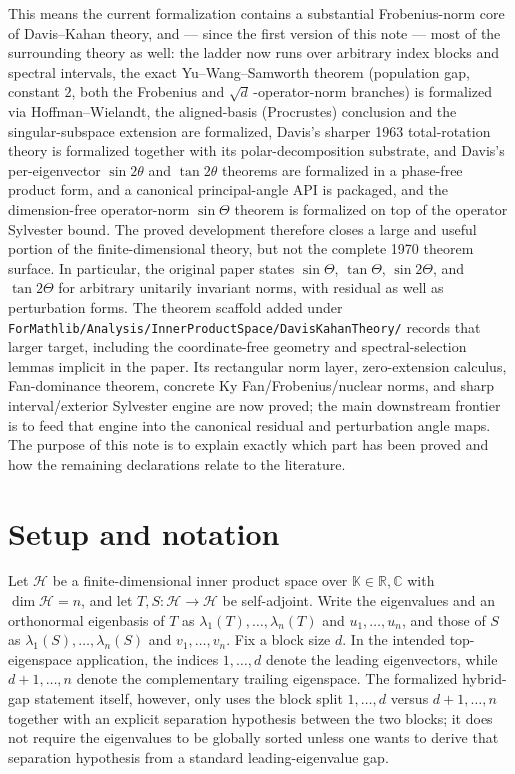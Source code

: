 \documentclass[11pt]{article}
\theoremstyle{remark}
\begin{document}
This means the current formalization contains a substantial Frobenius-norm core
of Davis--Kahan theory, and --- since the first version of this note --- most of
the surrounding theory as well: the ladder now runs over arbitrary index blocks
and spectral intervals, the exact Yu--Wang--Samworth theorem (population gap,
constant $2$, both the Frobenius and $\sqrt d\,$-operator-norm branches) is
formalized via Hoffman--Wielandt, the aligned-basis (Procrustes) conclusion and
the singular-subspace extension are formalized, Davis's sharper 1963
total-rotation theory is formalized together with its polar-decomposition
substrate, and Davis's per-eigenvector $\sin2\theta$ and $\tan2\theta$ theorems
are formalized in a phase-free product form, and a canonical principal-angle
API is packaged, and the dimension-free operator-norm $\sin\Theta$ theorem is
formalized on top of the operator Sylvester bound.  The proved development
therefore closes a large and useful portion of the finite-dimensional theory,
but not the complete 1970 theorem surface.  In particular, the original paper
states $\sin\Theta$, $\tan\Theta$, $\sin2\Theta$, and $\tan2\Theta$ for
arbitrary unitarily invariant norms, with residual as well as perturbation
forms.  The theorem scaffold added under
\texttt{ForMathlib/Analysis/InnerProductSpace/DavisKahanTheory/} records that
larger target, including the coordinate-free geometry and spectral-selection
lemmas implicit in the paper.  Its rectangular norm layer, zero-extension
calculus, Fan-dominance theorem, concrete Ky Fan/Frobenius/nuclear norms, and
sharp interval/exterior Sylvester engine are now proved; the main downstream
frontier is to feed that engine into the canonical residual and perturbation
angle maps.  The purpose of this note is to explain exactly which part has been
proved and how the remaining declarations relate to the literature.




\section{Setup and notation}

Let $\mathcal H$ be a finite-dimensional inner product space over
$\mathbb K\in{\mathbb R,\mathbb C}$ with $\dim\mathcal H=n$, and let
$T,S:\mathcal H\to\mathcal H$ be self-adjoint.  Write the eigenvalues and an
orthonormal eigenbasis of $T$ as $\lambda_1(T),\dots,\lambda_n(T)$ and
$u_1,\dots,u_n$, and those of $S$ as $\lambda_1(S),\dots,\lambda_n(S)$ and
$v_1,\dots,v_n$.  Fix a block size $d$.  In the intended top-eigenspace
application, the indices $1,\dots,d$ denote the leading eigenvectors, while
$d+1,\dots,n$ denote the complementary trailing eigenspace.  The formalized
hybrid-gap statement itself, however, only uses the block split
${1,\dots,d}$ versus ${d+1,\dots,n}$ together with an explicit separation
hypothesis between the two blocks; it does not require the eigenvalues to be
globally sorted unless one wants to derive that separation hypothesis from a
standard leading-eigenvalue gap.
\end{document}
